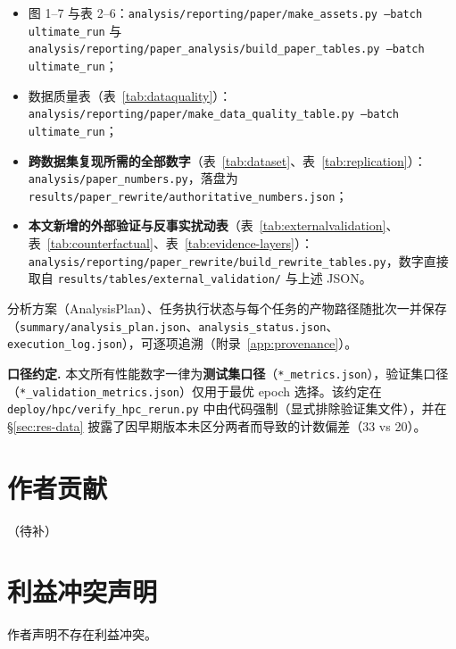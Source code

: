 \begin{itemize}
\item 图 1--7 与表 2--6：\texttt{analysis/reporting/paper/make\_assets.py --batch ultimate\_run} 与 \texttt{analysis/reporting/paper\_analysis/build\_paper\_tables.py --batch ultimate\_run}；
\item 数据质量表（表~\ref{tab:dataquality}）：\texttt{analysis/reporting/paper/make\_data\_quality\_table.py --batch ultimate\_run}；
\item \textbf{跨数据集复现所需的全部数字}（表~\ref{tab:dataset}、表~\ref{tab:replication}）：\texttt{analysis/paper\_numbers.py}，落盘为 \texttt{results/paper\_rewrite/authoritative\_numbers.json}；
\item \textbf{本文新增的外部验证与反事实扰动表}（表~\ref{tab:externalvalidation}、表~\ref{tab:counterfactual}、表~\ref{tab:evidence-layers}）：\texttt{analysis/reporting/paper\_rewrite/build\_rewrite\_tables.py}，数字直接取自 \texttt{results/tables/external\_validation/} 与上述 JSON。
\end{itemize}

分析方案（AnalysisPlan）、任务执行状态与每个任务的产物路径随批次一并保存（\texttt{summary/analysis\_plan.json}、\texttt{analysis\_status.json}、\texttt{execution\_log.json}），可逐项追溯（附录~\ref{app:provenance}）。

\textbf{口径约定.} 本文所有性能数字一律为\textbf{测试集口径}（\texttt{*\_metrics.json}），验证集口径（\texttt{*\_validation\_metrics.json}）仅用于最优 epoch 选择。该约定在 \texttt{deploy/hpc/verify\_hpc\_rerun.py} 中由代码强制（显式排除验证集文件），并在 \S\ref{sec:res-data} 披露了因早期版本未区分两者而导致的计数偏差（33 vs 20）。

\section*{作者贡献}
（待补）

\section*{利益冲突声明}
作者声明不存在利益冲突。
